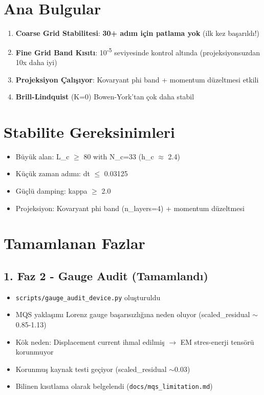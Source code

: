 \documentclass[11pt,a4paper]{article}
\begin{document}
\section*{Ana Bulgular}
\begin{enumerate}
    \item \textbf{Coarse Grid Stabilitesi}: \textbf{30+ adım için patlama yok} (ilk kez başarıldı!)
    \item \textbf{Fine Grid Band Kısıtı}: 10\textsuperscript{-5} seviyesinde kontrol altında (projeksiyonsuzdan 10x daha iyi)
    \item \textbf{Projeksiyon Çalışıyor}: Kovaryant phi band + momentum düzeltmesi etkili
    \item \textbf{Brill-Lindquist} (K=0) Bowen-York'tan çok daha stabil
\end{enumerate}

\section*{Stabilite Gereksinimleri}
\begin{itemize}
    \item Büyük alan: L\_c $\geq$ 80 with N\_c=33 (h\_c $\approx$ 2.4)
    \item Küçük zaman adımı: dt $\leq$ 0.03125
    \item Güçlü damping: kappa $\geq$ 2.0
    \item Projeksiyon: Kovaryant phi band (n\_layers=4) + momentum düzeltmesi
\end{itemize}

\section*{Tamamlanan Fazlar}

\subsection*{1. Faz 2 - Gauge Audit (Tamamlandı)}
\begin{itemize}
    \item \texttt{scripts/gauge\_audit\_device.py} oluşturuldu
    \item MQS yaklaşımı Lorenz gauge başarısızlığına neden oluyor (scaled\_residual $\sim$0.85-1.13)
    \item Kök neden: Displacement current ihmal edilmiş $\to$ EM stres-enerji tensörü korunmuyor
    \item Korunmuş kaynak testi geçiyor (scaled\_residual $\sim$0.03)
    \item Bilinen kısıtlama olarak belgelendi (\texttt{docs/mqs\_limitation.md})
\end{itemize}
\end{document}
